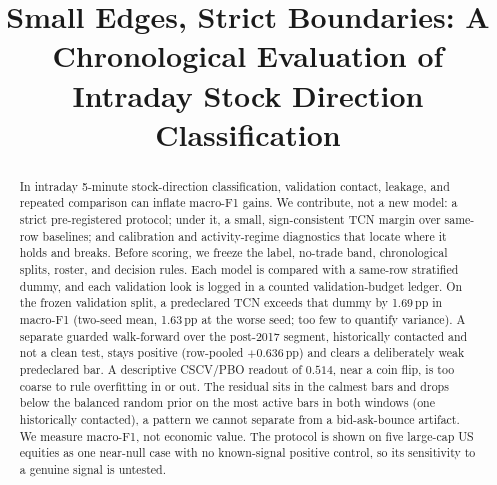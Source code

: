\documentclass[sigconf,review,anonymous]{acmart}
\newcommand{\macrofone}{macro-F1}          %
\newcommand{\pp}{\,\textrm{pp}}             %
\begin{document}
\raggedbottom

\title{Small Edges, Strict Boundaries: A Chronological Evaluation of Intraday Stock Direction Classification}


\begin{abstract}
In intraday 5-minute stock-direction classification, validation contact,
leakage, and repeated comparison can inflate \macrofone{} gains. We
contribute, not a new model: a strict pre-registered protocol; under it, a
small, sign-consistent TCN margin over same-row baselines; and calibration and
activity-regime diagnostics that locate where it holds and breaks. Before
scoring, we freeze the label, no-trade band, chronological splits, roster, and
decision rules. Each model is compared with a same-row stratified dummy, and
each validation look is logged in a counted validation-budget ledger. On the
frozen validation split, a predeclared TCN exceeds
that dummy by 1.69\pp{} in \macrofone{} (two-seed mean, 1.63\pp{} at the worse
seed; too few to quantify variance). A separate guarded walk-forward over the
post-2017 segment, historically contacted and not a clean test, stays positive
(row-pooled $+0.636\pp$) and clears a deliberately weak predeclared bar. A
descriptive CSCV/PBO readout of $0.514$, near a coin flip, is too coarse to
rule overfitting in or out. The residual sits in the calmest bars and drops
below the balanced random prior on the most active bars in both windows (one
historically contacted), a pattern we cannot separate from a bid-ask-bounce
artifact. We measure \macrofone{}, not economic value. The protocol is shown on
five large-cap US equities as one near-null case with no known-signal positive
control, so its sensitivity to a genuine signal is untested.
\end{abstract}
\end{document}
